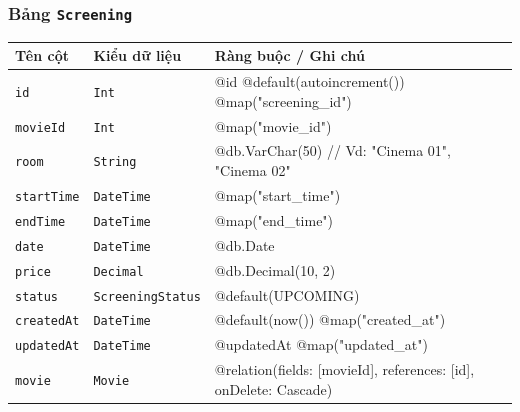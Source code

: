 \subsubsection{Bảng \texttt{Screening}}
\begin{longtable}{|p{3.6cm}|p{3.0cm}|p{8.9cm}|}
\hline
\rowcolor{headerblue} \textbf{Tên cột} & \textbf{Kiểu dữ liệu} & \textbf{Ràng buộc / Ghi chú} \\ \hline
\endhead
\texttt{id} & \texttt{Int} & \small @id @default(autoincrement()) @map("screening\_id") \\ \hline
\texttt{movieId} & \texttt{Int} & \small @map("movie\_id") \\ \hline
\texttt{room} & \texttt{String} & \small @db.VarChar(50) // Vd: "Cinema 01", "Cinema 02" \\ \hline
\texttt{startTime} & \texttt{DateTime} & \small @map("start\_time") \\ \hline
\texttt{endTime} & \texttt{DateTime} & \small @map("end\_time") \\ \hline
\texttt{date} & \texttt{DateTime} & \small @db.Date \\ \hline
\texttt{price} & \texttt{Decimal} & \small @db.Decimal(10, 2) \\ \hline
\texttt{status} & \texttt{ScreeningStatus} & \small @default(UPCOMING) \\ \hline
\texttt{createdAt} & \texttt{DateTime} & \small @default(now()) @map("created\_at") \\ \hline
\texttt{updatedAt} & \texttt{DateTime} & \small @updatedAt @map("updated\_at") \\ \hline
\texttt{movie} & \texttt{Movie} & \small @relation(fields: [movieId], references: [id], onDelete: Cascade) \\ \hline
\end{longtable}

